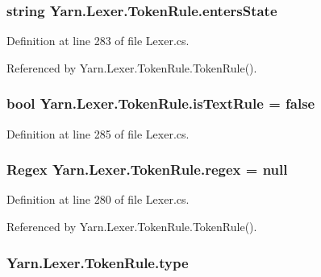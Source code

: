 \hypertarget{a00170_af6a4bd3416c4e1b8e56f9db461d52d18}{
\subsubsection[{enters\-State}]{\setlength{\rightskip}{0pt plus 5cm}string Yarn.\-Lexer.\-Token\-Rule.\-enters\-State}}\label{a00170_af6a4bd3416c4e1b8e56f9db461d52d18}


Definition at line 283 of file Lexer.\-cs.



Referenced by Yarn.\-Lexer.\-Token\-Rule.\-Token\-Rule().

\hypertarget{a00170_a09f49e6edf9ace38a92d723998181f8f}{
\subsubsection[{is\-Text\-Rule}]{\setlength{\rightskip}{0pt plus 5cm}bool Yarn.\-Lexer.\-Token\-Rule.\-is\-Text\-Rule = false}}\label{a00170_a09f49e6edf9ace38a92d723998181f8f}


Definition at line 285 of file Lexer.\-cs.

\hypertarget{a00170_a47a404d6637fae489c3c77729a01cc69}{
\subsubsection[{regex}]{\setlength{\rightskip}{0pt plus 5cm}Regex Yarn.\-Lexer.\-Token\-Rule.\-regex = null}}\label{a00170_a47a404d6637fae489c3c77729a01cc69}


Definition at line 280 of file Lexer.\-cs.



Referenced by Yarn.\-Lexer.\-Token\-Rule.\-Token\-Rule().

\hypertarget{a00170_a0de6fac3b55cf0c61e07cea53ce67caa}{
\subsubsection[{type}]{ Yarn.\-Lexer.\-Token\-Rule.\-type}}\label{a00170_a0de6fac3b55cf0c61e07cea53ce67caa}


